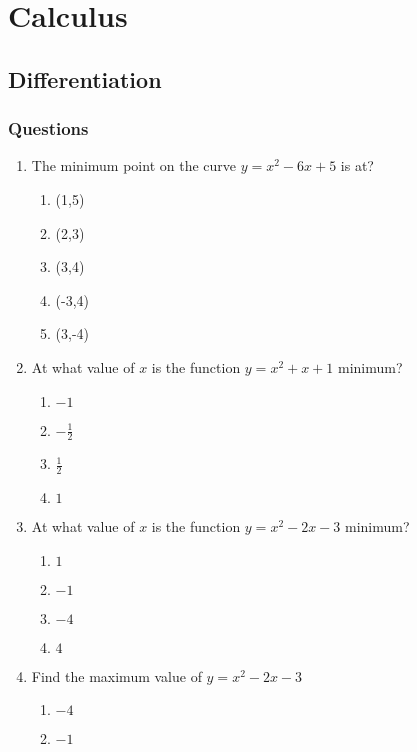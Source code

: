 \chapter{Calculus}
\section{Differentiation}
\subsection{Questions}
\begin{multicols}{2}
\begin{enumerate}[label={\arabic*.}]
  \item The minimum point on the curve \(y = x^2 - 6x + 5\) is at?
        \begin{enumerate}[label={\Alph*.}]
            \item (1,5)
            \item (2,3)
            \item (3,4)
            \item (-3,4)
            \item (3,-4)
        \end{enumerate}
  \item At what value of \(x\) is the function \(y = x^2 + x + 1\) minimum? 
        \begin{enumerate}[label={\Alph*.}]
            \item \(-1\)
            \item \(-\frac{1}{2}\)
            \item \(\frac{1}{2}\)
            \item \(1\)
        \end{enumerate}
  \item At what value of \(x\) is the function \(y = x^2 - 2x - 3\) minimum?
    \begin{enumerate}[label={\Alph*.}]
            \item \(1\) 
            \item  \(-1\) 
            \item \(-4\)
            \item \(4\)
        \end{enumerate}
  \item Find the maximum value of \(y = x^2 - 2x - 3\)
        \begin{enumerate}[label={\Alph*.}]
			\item \(-4\)
			\item \(-1\)

\end{enumerate}
\end{enumerate}
\end{multicols}
